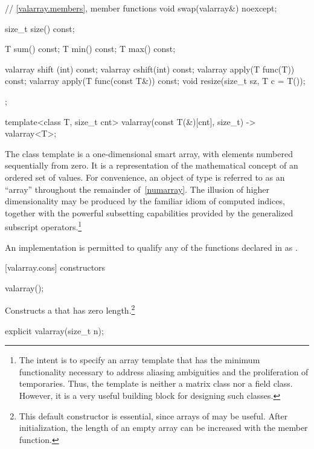 \begin{codeblock}
{{    // \ref{valarray.members}, member functions
    void swap(valarray&) noexcept;

    size_t size() const;

    T sum() const;
    T min() const;
    T max() const;

    valarray shift (int) const;
    valarray cshift(int) const;
    valarray apply(T func(T)) const;
    valarray apply(T func(const T&)) const;
    void resize(size_t sz, T c = T());
  };

  template<class T, size_t cnt> valarray(const T(&)[cnt], size_t) -> valarray<T>;
}
\end{codeblock}

\pnum
The
class template
is a
one-dimensional smart array, with elements numbered sequentially from zero.
It is a representation of the mathematical concept
of an ordered set of values.
For convenience, an object of type  is referred
to as an ``array'' throughout the remainder of~\ref{numarray}.
The illusion of higher dimensionality
may be produced by the familiar idiom of computed indices, together
with the powerful subsetting capabilities provided
by the generalized subscript operators.\footnote{The intent is to specify
an array template that has the minimum functionality
necessary to address aliasing ambiguities and the proliferation of
temporaries.
Thus, the
template is neither a
matrix class nor a field class.
However, it is a very useful building block for designing such classes.}

\pnum
An implementation is permitted to qualify any of the functions declared in
as
.

[valarray.cons]{ constructors}

%
\begin{itemdecl}
valarray();
\end{itemdecl}

\begin{itemdescr}
\pnum
\effects
Constructs a 
that has zero length.\footnote{This default constructor is essential,
since arrays of
may be useful.
After initialization, the length of an empty array can be increased with the
member function.}
\end{itemdescr}

%
\begin{itemdecl}
explicit valarray(size_t n);
\end{itemdecl}

